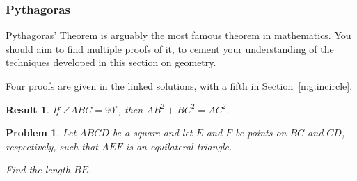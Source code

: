 \documentclass{amsart}
\newtheorem{problem}{Problem}[subsubsection]
\newtheorem{result}{Result}[subsubsection]
\begin{document}
\subsubsection{Pythagoras}
Pythagoras' Theorem is arguably the most famous theorem in mathematics. You
should aim to find multiple proofs of it, to cement your understanding of the
techniques developed in this section on geometry.

Four proofs are given in the linked solutions, with a fifth in
Section~\ref{n:g:incircle}.
\begin{result}{\label{r:b:g:py:1}}
    If $\angle ABC=90^\circ$, then $AB^2+BC^2=AC^2$.
\end{result}
\begin{problem}{\label{p:b:g:py:1}}
  Let $ABCD$ be a square and let $E$ and $F$ be points on $BC$ and $CD$,
  respectively, such that $AEF$ is an equilateral triangle.

  Find the length $BE$.
\end{problem}
\end{document}
